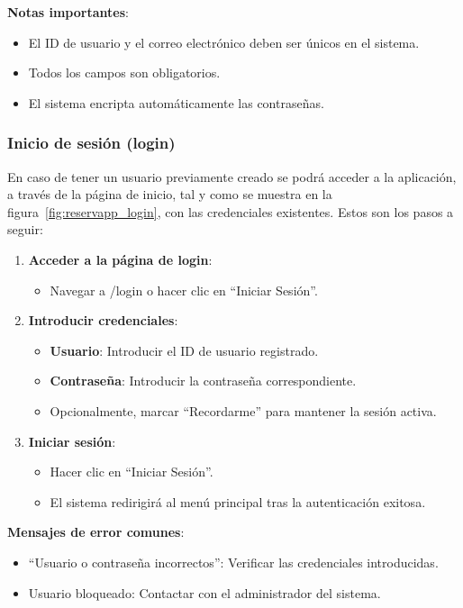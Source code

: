 \textbf{Notas importantes}:
\begin{itemize}
   \item El ID de usuario y el correo electrónico deben ser únicos en el sistema.
   \item Todos los campos son obligatorios.
   \item El sistema encripta automáticamente las contraseñas.
\end{itemize}

\subsubsection{Inicio de sesión (login)}
En caso de tener un usuario previamente creado se podrá acceder a la aplicación, a través de la página de inicio, tal y como se muestra en la figura~\ref{fig:reservapp_login}, con las credenciales existentes. Estos son los pasos a seguir:

\begin{enumerate}
   \item \textbf{Acceder a la página de login}:

   \begin{itemize}
      \item Navegar a /login o hacer clic en ``Iniciar Sesión''.
   \end{itemize}
   \item \textbf{Introducir credenciales}:
   \begin{itemize}
      \item \textbf{Usuario}: Introducir el ID de usuario registrado.
      \item \textbf{Contraseña}: Introducir la contraseña correspondiente.
      \item Opcionalmente, marcar ``Recordarme'' para mantener la sesión activa.
   \end{itemize}
   \item \textbf{Iniciar sesión}:
   \begin{itemize}
      \item Hacer clic en ``Iniciar Sesión''.
      \item El sistema redirigirá al menú principal tras la autenticación exitosa.
   \end{itemize}
\end{enumerate}

\textbf{Mensajes de error comunes}:
\begin{itemize}
   \item ``Usuario o contraseña incorrectos'': Verificar las credenciales introducidas.
   \item Usuario bloqueado: Contactar con el administrador del sistema.
\end{itemize}

